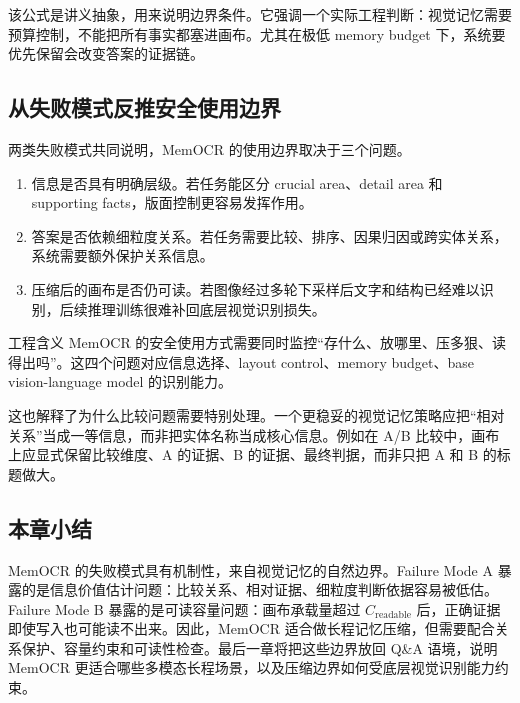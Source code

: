 该公式是讲义抽象，用来说明边界条件。它强调一个实际工程判断：视觉记忆需要预算控制，不能把所有事实都塞进画布。尤其在极低 memory budget 下，系统要优先保留会改变答案的证据链。

\subsection{从失败模式反推安全使用边界}

两类失败模式共同说明，MemOCR 的使用边界取决于三个问题。

\begin{enumerate}
  \item 信息是否具有明确层级。若任务能区分 crucial area、detail area 和 supporting facts，版面控制更容易发挥作用。
  \item 答案是否依赖细粒度关系。若任务需要比较、排序、因果归因或跨实体关系，系统需要额外保护关系信息。
  \item 压缩后的画布是否仍可读。若图像经过多轮下采样后文字和结构已经难以识别，后续推理训练很难补回底层视觉识别损失。
\end{enumerate}

\begin{knowledgebox}{工程含义}
MemOCR 的安全使用方式需要同时监控“存什么、放哪里、压多狠、读得出吗”。这四个问题对应信息选择、layout control、memory budget、base vision-language model 的识别能力。
\end{knowledgebox}

这也解释了为什么比较问题需要特别处理。一个更稳妥的视觉记忆策略应把“相对关系”当成一等信息，而非把实体名称当成核心信息。例如在 A/B 比较中，画布上应显式保留比较维度、A 的证据、B 的证据、最终判据，而非只把 A 和 B 的标题做大。

\subsection{本章小结}

MemOCR 的失败模式具有机制性，来自视觉记忆的自然边界。Failure Mode A 暴露的是信息价值估计问题：比较关系、相对证据、细粒度判断依据容易被低估。Failure Mode B 暴露的是可读容量问题：画布承载量超过 $C_{\text{readable}}$ 后，正确证据即使写入也可能读不出来。因此，MemOCR 适合做长程记忆压缩，但需要配合关系保护、容量约束和可读性检查。最后一章将把这些边界放回 Q\&A 语境，说明 MemOCR 更适合哪些多模态长程场景，以及压缩边界如何受底层视觉识别能力约束。

